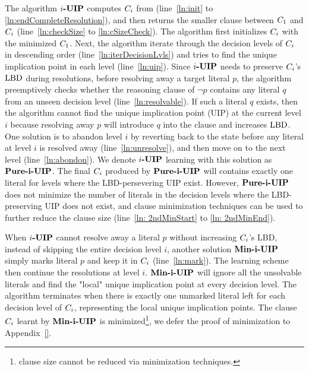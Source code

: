 \documentclass[runningheads]{llncs}
\begin{document}
The algorithm $\textbf{$i$-UIP}$ computes $C_{i}$ from (line~\ref{ln:init}
to \ref{ln:endCompleteResolution}), and then returns the smaller
clause between $C_{1}$ and $C_{i}$
(line~\ref{ln:checkSize} to \ref{ln:cSizeCheck}).  The algorithm first
initializes $C_{i}$ with the minimized\cite{}
$C_{1}$. Next, the algorithm iterate through the decision
levels of $C_{i}$ in descending order
(line~\ref{ln:iterDecisionLvls}) and tries to find the unique
implication point in each level (line~\ref{ln:uip}). Since $\textbf{$i$-UIP}$
needs to preserve $C_{i}$'s $\text{LBD}$ during resolutions, before
resolving away a target literal $p$, the algorithm preemptively checks
whether the reasoning clause of $\neg{p}$ contains any literal $q$
from an unseen decision level (line~\ref{ln:resolvable}). If such a
literal $q$ exists, then the algorithm cannot find the unique
implication point (UIP) at the current level $i$ because resolving
away $p$ will introduce $q$ into the clause and increases $\text{LBD}$. One
solution is to abandon level $i$ by reverting back to the state before
any literal at level $i$ is resolved away (line~\ref{ln:unresolve}),
and then move on to the next level (line~\ref{ln:abondon}). We denote
$\textbf{$i$-UIP}$ learning with this solution as $\textbf{Pure-i-UIP}$. The final
$C_{i}$ produced by $\textbf{Pure-i-UIP}$ will contains exactly one
literal for levels where the LBD-persevering UIP exist. However,
$\textbf{Pure-i-UIP}$ does not minimize the number of literals in the decision
levels where the LBD-preserving UIP does not exist, and clause
minimization techniques\cite{} can be used to further reduce the
clause size (line~\ref{ln: 2ndMinStart} to \ref{ln: 2ndMinEnd}).

When $\textbf{$i$-UIP}$ cannot resolve away a literal $p$ without increasing
$C_{i}$'s LBD, instead of skipping the entire decision level
$i$, another solution $\textbf{Min-i-UIP}$ simply marks literal $p$ and keep it
in $C_{i}$ (line~\ref{ln:mark}). The learning scheme then
continue the resolutions at level $i$. $\textbf{Min-i-UIP}$ will ignore all the
unsolvable literals and find the "local" unique implication point at
every decision level.  The algorithm terminates when there is exactly
one unmarked literal left for each decision level of $C_{i}$,
representing the local unique implication points. The clause
$C_{i}$ learnt by $\textbf{Min-i-UIP}$ is minimized\footnote{clause size
  cannot be reduced via minimization techniques\cite{}.}, we defer the
proof of minimization to Appendix~\ref{}.
\end{document}

